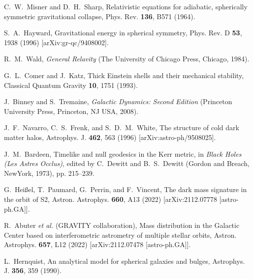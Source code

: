 \documentclass[aps,11pt,nofootinbib,preprintnumbers,groupedaddress,superscriptaddress]{revtex4-2}
\begin{document}
\begin{thebibliography}{99}
%
C.~W.~Misner and D.~H.~Sharp,
Relativistic equations for adiabatic, spherically symmetric gravitational collapse,
Phys. Rev. \textbf{136}, B571 (1964).

%
S.~A.~Hayward,
Gravitational energy in spherical symmetry,
Phys. Rev. D \textbf{53}, 1938 (1996)
[arXiv:gr-qc/9408002].

%
R.~M.~Wald, 
\textit{General Relavity}
(The University of Chicago Press, Chicago, 1984).

%
G.~L.~Comer and J.~Katz,
Thick Einstein shells and their mechanical stability,
Classical Quantum Gravity \textbf{10}, 1751 (1993).

%
J.~Binney and S.~Tremaine,  
\textit{Galactic Dynamics: Second Edition}
(Princeton University Press, Princeton, NJ USA, 2008).

%
J.~F.~Navarro, C.~S.~Frenk, and S.~D.~M.~White,
The structure of cold dark matter halos,
Astrophys. J. \textbf{462}, 563 (1996)
[arXiv:astro-ph/9508025].

%
J.~M.~Bardeen, 
Timelike and null geodesics in the Kerr metric, 
in \textit{Black Holes (Les Astres Occlus)}, 
edited by C.~Dewitt and B.~S.~Dewitt (Gordon and Breach, NewYork, 1973), pp. 215--239.

G.~Hei\ss{}el, T.~Paumard, G.~Perrin, and F.~Vincent,
The dark mass signature in the orbit of S2,
Astron. Astrophys. \textbf{660}, A13 (2022)
[arXiv:2112.07778 [astro-ph.GA]].

R.~Abuter \textit{et al.} (GRAVITY collaboration),
Mass distribution in the Galactic Center based on interferometric astrometry of multiple stellar orbits,
Astron. Astrophys. \textbf{657}, L12 (2022)
[arXiv:2112.07478 [astro-ph.GA]].

%
L.~Hernquist,
An analytical model for spherical galaxies and bulges,
Astrophys. J. \textbf{356}, 359 (1990).

\end{thebibliography}
\end{document}
